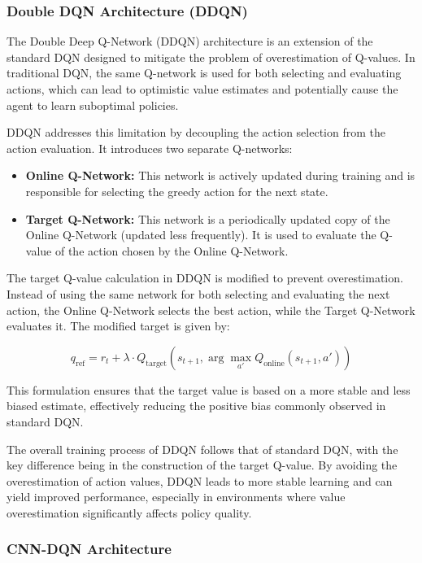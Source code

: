 \documentclass[16pt]{report}
\begin{document}
\subsubsection{Double DQN Architecture (DDQN)}

The Double Deep Q-Network (DDQN) architecture is an extension of the standard DQN designed to mitigate the problem of overestimation of Q-values. In traditional DQN, the same Q-network is used for both selecting and evaluating actions, which can lead to optimistic value estimates and potentially cause the agent to learn suboptimal policies.

DDQN addresses this limitation by decoupling the action selection from the action evaluation. It introduces two separate Q-networks:

\begin{itemize}
    \item \textbf{Online Q-Network:} This network is actively updated during training and is responsible for selecting the greedy action for the next state.
    
    \item \textbf{Target Q-Network:} This network is a periodically updated copy of the Online Q-Network (updated less frequently). It is used to evaluate the Q-value of the action chosen by the Online Q-Network.
\end{itemize}

The target Q-value calculation in DDQN is modified to prevent overestimation. Instead of using the same network for both selecting and evaluating the next action, the Online Q-Network selects the best action, while the Target Q-Network evaluates it. The modified target is given by:

\[
q_{\text{ref}} = r_t + \lambda \cdot Q_{\text{target}}(s_{t+1}, \arg\max_{a'} Q_{\text{online}}(s_{t+1}, a'))
\]

This formulation ensures that the target value is based on a more stable and less biased estimate, effectively reducing the positive bias commonly observed in standard DQN.

The overall training process of DDQN follows that of standard DQN, with the key difference being in the construction of the target Q-value. By avoiding the overestimation of action values, DDQN leads to more stable learning and can yield improved performance, especially in environments where value overestimation significantly affects policy quality.

\subsubsection{CNN-DQN Architecture}
\end{document}
